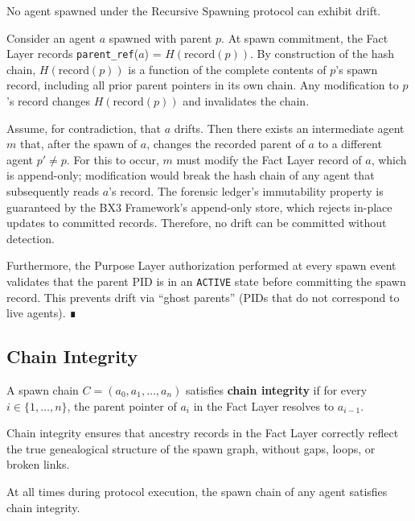 \begin{Theorem}
No agent spawned under the Recursive Spawning protocol can exhibit
drift.
\end{Theorem}

\begin{Proof}
Consider an agent $a$ spawned with parent $p$. At spawn commitment,
the Fact Layer records \texttt{parent\_ref}($a$) = $H(\text{record}(p))$.
By construction of the hash chain, $H(\text{record}(p))$ is a function of
the complete contents of $p$'s spawn record, including all prior
parent pointers in its own chain. Any modification to $p$'s record
changes $H(\text{record}(p))$ and invalidates the chain.

Assume, for contradiction, that $a$ drifts. Then there exists an
intermediate agent $m$ that, after the spawn of $a$, changes the
recorded parent of $a$ to a different agent $p' \neq p$. For this to
occur, $m$ must modify the Fact Layer record of $a$, which is append-only;
modification would break the hash chain of any agent that subsequently
reads $a$'s record. The forensic ledger's immutability property is
guaranteed by the BX3 Framework's append-only store, which rejects
in-place updates to committed records. Therefore, no drift can be
committed without detection.

Furthermore, the Purpose Layer authorization performed at every spawn
event validates that the parent PID is in an \texttt{ACTIVE} state before
committing the spawn record. This prevents drift via ``ghost parents''
(PIDs that do not correspond to live agents). ∎
\end{Proof}

\subsection{Chain Integrity}
\label{sec:chain-integrity}

\begin{definition}
A spawn chain $C = (a_0, a_1, \dots, a_n)$ satisfies \textbf{chain
integrity} if for every $i \in \{1, \dots, n\}$, the parent pointer of
$a_i$ in the Fact Layer resolves to $a_{i-1}$.
\end{definition}

Chain integrity ensures that ancestry records in the Fact Layer correctly
reflect the true genealogical structure of the spawn graph, without
gaps, loops, or broken links.

\begin{Theorem}
At all times during protocol execution, the spawn chain of any agent
satisfies chain integrity.
\end{Theorem}

